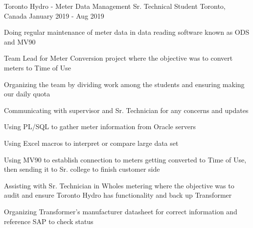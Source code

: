 


\begin{cventries}





\cventry
{Toronto Hydro - Meter Data Management} %
{Sr. Technical Student} %
{Toronto, Canada} %
{January 2019 - Aug 2019} %
{ %
\begin{cvitems}
\item {Doing regular maintenance of meter data in data reading software known as ODS and MV90}
\item {Team Lead for Meter Conversion project where the objective was to convert meters to Time of Use}
\item {Organizing the team by dividing work among the students and ensuring making our daily quota}
\item {Communicating with supervisor and Sr. Technician for any concerns and updates}
\item {Using PL/SQL to gather meter information from Oracle servers}
\item {Using Excel macros to interpret or compare large data set}
\item {Using MV90 to establish connection to meters getting converted to Time of Use, then sending it to Sr. college to finish customer side}
\item {Assisting with Sr. Technician in Wholes metering where the objective was to audit and ensure Toronto Hydro has functionality and back up Transformer}
\item {Organizing Transformer's manufacturer datasheet for correct information and reference SAP to check status}
\end{cvitems}
}


\end{cventries}